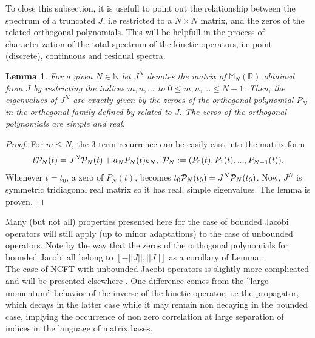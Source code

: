 \documentclass[10pt]{book}
\theoremstyle{break}
\newtheorem{lemma}{Lemma}
\begin{document}
To close this subsection, it is usefull to point out the relationship between the spectrum of a truncated $J$, i.e restricted to a $N\times N$ matrix, and the zeros of the related orthogonal polynomials. This will be helpfull in the process of characterization of the total spectrum of the kinetic operators, i.e point (discrete), continuous and residual spectra.
\begin{lemma}
For a given $N\in\mathbb{N}$ let $J^N$ denotes the matrix of $\mathbb{M}_N(\mathbb{R})$ obtained from $J$ %
by restricting the indices $m,n,...$ to $0\le m,n,...\le N-1$. Then, the eigenvalues of $J^N$ are exactly given by the zeroes of the orthogonal polynomial $P_N$ in the orthogonal family defined by %
related to $J$. The zeros of the orthogonal polynomials are simple and real.
\end{lemma}
\begin{proof}
For $m\le N$, the 3-term recurrence %
can be easily cast into the matrix form 
\begin{equation*}
t{\cal{P}}_N(t)=J^N{\cal{P}}_N(t)+a_NP_N(t)e_N,\ {\cal{P}}_N:=(P_0(t),P_1(t),...,P_{N-1}(t)).
\end{equation*}
Whenever $t=t_0$, a zero of $P_N(t)$, %
becomes $t_0{\cal{P}}_N(t_0)=J^N{\cal{P}}_N(t_0)$. Now, $J^N$ is symmetric tridiagonal real matrix so it has real, simple eigenvalues. The lemma is proven.
\end{proof}
Many (but not all) properties presented here for the case of bounded Jacobi operators will still apply (up to minor adaptations) to the case of unbounded operators. Note by the way that the zeros of the orthogonal polynomials for bounded Jacobi all belong to $[-||J||,||J||]$ as a corollary of Lemma %
.\\
The case of NCFT with unbounded Jacobi operators is slightly more complicated and will be presented elsewhere %
. One difference comes from the ''large momentum'' behavior of the inverse of the kinetic operator, i.e the propagator, which decays in the latter case while it may remain non decaying in the bounded case, implying the occurrence of non zero correlation at large separation of indices in the language of matrix bases.\\
\end{document}
